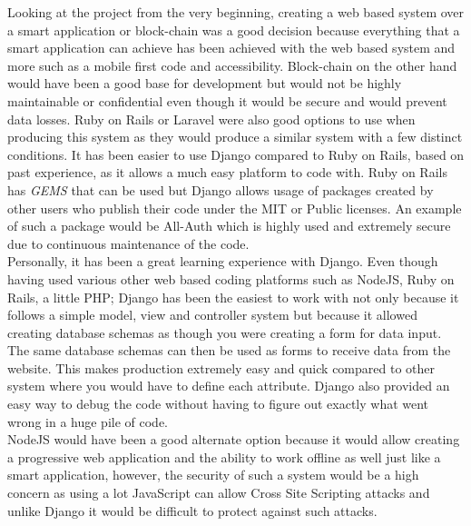 \documentclass[../main.tex]{subfiles}
\begin{document}
\raggedright
Looking at the project from the very beginning, creating a web based system over a smart application or block-chain was a good decision because everything that a smart application can achieve has been achieved with the web based system and more such as a mobile first code and accessibility. Block-chain on the other hand would have been a good base for development but would not be highly maintainable or confidential even though it would be secure and would prevent data losses. Ruby on Rails or Laravel were also good options to use when producing this system as they would produce a similar system with a few distinct conditions. It has been easier to use Django compared to Ruby on Rails, based on past experience, as it allows a much easy platform to code with. Ruby on Rails has \textit{GEMS} that can be used but Django allows usage of packages created by other users who publish their code under the MIT or Public licenses. An example of such a package would be All-Auth which is highly used and extremely secure due to continuous maintenance of the code. \\[4mm]

Personally, it has been a great learning experience with Django. Even though having used various other web based coding platforms such as NodeJS, Ruby on Rails, a little PHP; Django has been the easiest to work with not only because it follows a simple model, view and controller system but because it allowed creating database schemas as though you were creating a form for data input. The same database schemas can then be used as forms to receive data from the website. This makes production extremely easy and quick compared to other system where you would have to define each attribute. Django also provided an easy way to debug the code without having to figure out exactly what went wrong in a huge pile of code.  \\[4mm]

NodeJS would have been a good alternate option because it would allow creating a progressive web application and the ability to work offline as well just like a smart application, however, the security of such a system would be a high concern as using a lot JavaScript can allow Cross Site Scripting attacks and unlike Django it would be difficult to protect against such attacks. 
\end{document}
